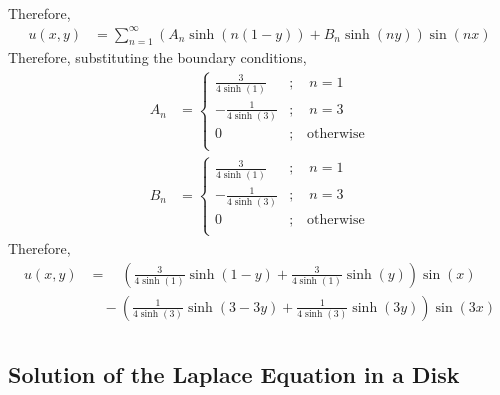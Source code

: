 \documentclass[titlepage, fleqn, a4paper, 12pt, twoside]{article}
\theoremstyle{definition}
\theoremstyle{theorem}
\begin{document}
\begin{solution}
\begin{align*}
	\end{align*}
	Therefore,
	\begin{align*}
		u(x,y) & = \sum\limits_{n = 1}^{\infty} \left( A_n \sinh\left( n (1 - y) \right) + B_n \sinh(n y) \right) \sin(n x)
	\end{align*}
	Therefore, substituting the boundary conditions,
	\begin{align*}
		A_n &=
			\begin{cases}
				\frac{3}{4 \sinh(1)}  & ;\quad n = 1            \\
				-\frac{1}{4 \sinh(3)} & ;\quad n = 3            \\
				0                     & ;\quad \text{otherwise} \\
			\end{cases}\\
		B_n &=
			\begin{cases}
				\frac{3}{4 \sinh(1)}  & ;\quad n = 1            \\
				-\frac{1}{4 \sinh(3)} & ;\quad n = 3            \\
				0                     & ;\quad \text{otherwise} \\
			\end{cases}
	\end{align*}
	Therefore,
	\begin{align*}
		u(x,y) & = \quad \left( \frac{3}{4 \sinh(1)} \sinh(1 - y) + \frac{3}{4 \sinh(1)} \sinh(y) \right) \sin(x)       \\
                       & \quad - \left( \frac{1}{4 \sinh(3)} \sinh(3 - 3 y) + \frac{1}{4 \sinh(3)} \sinh(3 y) \right) \sin(3 x) \\
	\end{align*}
\end{solution}

\subsection{Solution of the Laplace Equation in a Disk}
\end{document}

